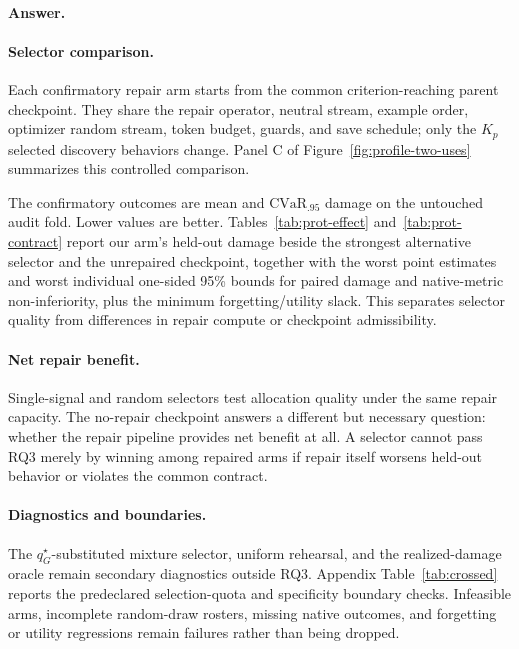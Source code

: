 \paragraph{Answer.}
{\setlength{\emergencystretch}{3em}\ProtectionHeadline\par}

\paragraph{Selector comparison.}
Each confirmatory repair arm starts from the common criterion-reaching parent
checkpoint. They share the repair operator, neutral stream, example order,
optimizer random stream, token budget, guards, and save schedule; only the
$K_p$ selected discovery behaviors change. Panel C of
Figure~\ref{fig:profile-two-uses} summarizes this controlled comparison.

The confirmatory outcomes are mean and $\mathrm{CVaR}_{.95}$ damage on the
untouched audit fold. Lower values are better.
Tables~\ref{tab:prot-effect} and~\ref{tab:prot-contract} report our arm's
held-out damage beside the
strongest alternative selector and the unrepaired checkpoint, together with
the worst point estimates and worst individual one-sided 95\% bounds for paired
damage and native-metric non-inferiority, plus the minimum forgetting/utility
slack. This separates selector quality from
differences in repair compute or checkpoint admissibility.

\paragraph{Net repair benefit.}
Single-signal and random selectors test allocation quality under the same
repair capacity. The no-repair checkpoint answers a
different but necessary question: whether the repair pipeline provides net
benefit at all. A selector cannot pass RQ3 merely by winning among repaired
arms if repair itself worsens held-out behavior or violates the common
contract.

\paragraph{Diagnostics and boundaries.}
The $q_G^\star$-substituted mixture selector, uniform rehearsal, and the
realized-damage oracle remain secondary diagnostics outside RQ3. Appendix
Table~\ref{tab:crossed} reports the predeclared selection-quota and specificity
boundary checks. Infeasible arms, incomplete random-draw
rosters, missing native outcomes, and forgetting or utility regressions remain
failures rather than being dropped.

